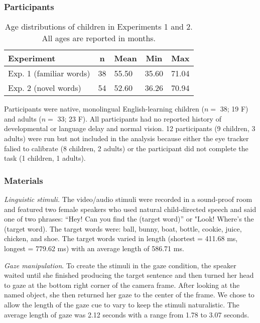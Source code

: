 \documentclass[10pt, letterpaper]{article}
\begin{document}
\hypertarget{participants}{%
\subsubsection{Participants}\label{participants}}

\begin{table}[tbp]
\begin{center}
\begin{threeparttable}
\caption{\label{tab:make-ss-table}Age distributions of children in Experiments 1 and 2. All ages are reported in months.}
\begin{tabular}{lllll}
\toprule
Experiment & \multicolumn{1}{c}{n} & \multicolumn{1}{c}{Mean} & \multicolumn{1}{c}{Min} & \multicolumn{1}{c}{Max}\\
\midrule
Exp. 1 (familiar words) & 38 & 55.50 & 35.60 & 71.04\\
Exp. 2 (novel words) & 54 & 52.60 & 36.26 & 70.94\\
\bottomrule
\end{tabular}
\end{threeparttable}
\end{center}
\end{table}

Participants were native, monolingual English-learning children (\(n=\)
38; 19 F) and adults (\(n=\) 33; 23 F). All participants had no reported
history of developmental or language delay and normal vision. 12
participants (9 children, 3 adults) were run but not included in the
analysis because either the eye tracker falied to calibrate (8 children,
2 adults) or the participant did not complete the task (1 children, 1
adults).

\hypertarget{materials}{%
\subsubsection{Materials}\label{materials}}

\emph{Linguistic stimuli.} The video/audio stimuli were recorded in a
sound-proof room and featured two female speakers who used natural
child-directed speech and said one of two phrases: ``Hey! Can you find
the (target word)'' or "Look! Where's the (target word). The target
words were: ball, bunny, boat, bottle, cookie, juice, chicken, and shoe.
The target words varied in length (shortest = 411.68 ms, longest =
779.62 ms) with an average length of 586.71 ms.

\emph{Gaze manipulation}. To create the stimuli in the gaze condition,
the speaker waited until she finished producing the target sentence and
then turned her head to gaze at the bottom right corner of the camera
frame. After looking at the named object, she then returned her gaze to
the center of the frame. We chose to allow the length of the gaze cue to
vary to keep the stimuli naturalistic. The average length of gaze was
2.12 seconds with a range from 1.78 to 3.07 seconds.
\end{document}
